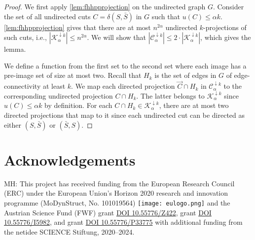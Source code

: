 \documentclass[11pt,a4paper]{article}
\begin{document}
\directedcutcounting*
\begin{proof}
We first apply \cref{lem:fhhpprojection} on the undirected graph $G$.
Consider the set of all undirected cuts $C = \delta(S, \bar{S})$ in $G$ such that $u(C) \le \alpha k$.
\cref{lem:fhhpprojection} gives that there are at most $n^{2\alpha}$ undirected $k$-projections of such cuts, i.e., $|\mathcal K^{\downarrow k}_{\alpha}| \le n^{2\alpha}$.
We will show that $|\mathcal C^{\downarrow k}_{\alpha}| \le 2 \cdot |\mathcal K^{\downarrow k}_{\alpha}|$, which gives the lemma.

We define a function from the first set to the second set where each image has a pre-image set of size at most two.
Recall that $H_k$ is the set of edges in $G$ of edge-connectivity at least $k$.
We map each directed projection $\vec{C} \cap H_k$ in $\mathcal C^{\downarrow k}_\alpha$ to the corresponding undirected projection $C \cap H_k$. The latter belongs to $\mathcal K^{\downarrow k}_\alpha$ since $u(C) \le \alpha k$ by definition. For each $C \cap H_k \in \mathcal K^{\downarrow k}_\alpha$, there are at most two directed projections that map to it since each undirected cut can be directed as either $(S, \bar{S})$ or $(\bar{S}, S)$.
\end{proof}
\section*{Acknowledgements}
\label{sec:ack}

MH: This project has received funding from the European Research Council (ERC) under the European Union's Horizon 2020 research and innovation programme (MoDynStruct, No. 101019564)  \texttt{[image: eulogo.png]} and the Austrian Science Fund (FWF) grant  \href{https://www.doi.org/10.55776/Z422}{DOI 10.55776/Z422}, grant  \href{https://www.doi.org/10.55776/I5982}{DOI 10.55776/I5982}, and grant  \href{https://www.doi.org/10.55776/P33775}{DOI 10.55776/P33775} with additional funding from the netidee SCIENCE Stiftung, 2020–2024.
 

\def\bibfont{\small}

\end{document}
